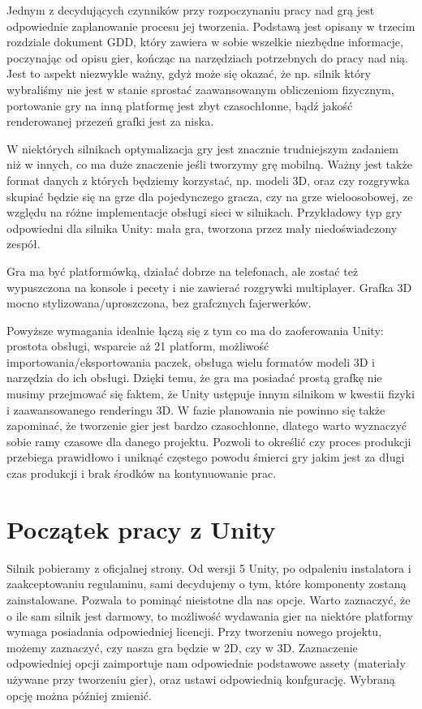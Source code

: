 \documentclass[brudnopis]{xmgr}
\begin{document}
Jednym z decydujących czynników przy rozpoczynaniu pracy nad grą jest odpowiednie zaplanowanie procesu jej tworzenia. Podstawą jest opisany w trzecim rozdziale dokument GDD, który zawiera w sobie wszelkie niezbędne informacje, poczynając od opisu gier, kończąc na narzędziach potrzebnych do pracy nad nią. Jest to aspekt niezwykle ważny, gdyż może się okazać, że np. silnik który wybraliśmy nie jest w stanie sprostać zaawansowanym obliczeniom fizycznym, portowanie gry na inną platformę jest zbyt czasochłonne, bądź jakość renderowanej przezeń grafki jest za niska. 

W niektórych silnikach optymalizacja gry jest znacznie trudniejszym zadaniem niż w innych, co ma duże znaczenie jeśli tworzymy grę mobilną. Ważny jest także format danych z których będziemy korzystać, np. modeli 3D, oraz czy rozgrywka skupiać będzie się na grze dla pojedynczego gracza, czy na grze wieloosobowej, ze względu na różne implementacje obsługi sieci w silnikach. Przykładowy typ gry odpowiedni dla silnika Unity: mała gra, tworzona przez mały niedoświadczony zespół. 

Gra ma być platformówką, działać dobrze na telefonach, ale zostać też wypuszczona na konsole i pecety i nie zawierać rozgrywki multiplayer. Grafka 3D mocno stylizowana/uproszczona, bez grafcznych fajerwerków. 

Powyższe wymagania idealnie łączą się z tym co ma do zaoferowania Unity: prostota obsługi, wsparcie aż 21 platform, możliwość importowania/eksportowania paczek, obsługa wielu formatów modeli 3D i narzędzia do ich obsługi. Dzięki temu, że gra ma posiadać prostą grafkę nie musimy przejmować się faktem, że Unity ustępuje innym silnikom w kwestii fizyki i zaawansowanego renderingu 3D. W fazie planowania nie powinno się także zapominać, że tworzenie gier jest bardzo czasochłonne, dlatego warto wyznaczyć sobie ramy czasowe dla danego projektu. Pozwoli to określić czy proces produkcji przebiega prawidłowo i uniknąć częstego powodu śmierci gry jakim jest za długi czas produkcji i brak środków na kontynuowanie prac.
 
\section{Początek pracy z Unity}

Silnik pobieramy z oficjalnej strony. Od wersji 5 Unity, po odpaleniu instalatora i zaakceptowaniu regulaminu, sami decydujemy o tym, które komponenty zostaną zainstalowane. Pozwala to pominąć nieistotne dla nas opcje. Warto zaznaczyć, że o ile sam silnik jest darmowy, to możliwość wydawania gier na niektóre platformy wymaga posiadania odpowiedniej licencji. Przy tworzeniu nowego projektu, możemy zaznaczyć, czy nasza gra będzie w 2D, czy w 3D. Zaznaczenie odpowiedniej opcji zaimportuje nam odpowiednie podstawowe assety (materiały używane przy tworzeniu gier), oraz ustawi odpowiednią konfgurację. 
Wybraną opcję można później zmienić. 
\end{document}
